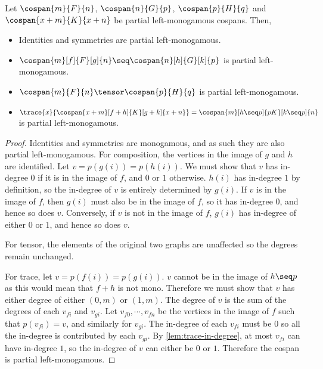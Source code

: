 \begin{lemma}
    \label{lem:partial-monogamous-ops}
    Let \(\cospan{m}{F}{n}\), \(\cospan{n}{G}{p}\), \(\cospan{p}{H}{q}\) and \(\cospan{x+m}{K}{x+n}\) be partial left-monogamous cospans.
    Then,
    \begin{itemize}
        \item Identities and symmetries are partial left-monogamous.
        \item \(\cospan{m}[f]{F}[g]{n} \seq \cospan{n}[h]{G}[k]{p}\) is partial left-monogamous.
        \item \(\cospan{m}{F}{n} \tensor \cospan{p}{H}{q}\) is partial left-monogamous.
        \item \(\trace{x}{\cospan{x+m}[f+h]{K}[g+k]{x+n}} = \cospan{m}[h \seq p]{pK}[k \seq p]{n}\) is partial left-monogamous.
    \end{itemize}
\end{lemma}
\begin{proof}
    Identities and symmetries are monogamous, and as such they are also partial left-monogamous.
    For composition, the vertices in the image of \(g\) and \(h\) are identified.
    Let \(v = p(g(i)) = p(h(i))\).
    We must show that \(v\) has in-degree \(0\) if it is in the image of \(f\), and \(0\) or \(1\) otherwise.
    \(h(i)\) has in-degree \(1\) by definition, so the in-degree of \(v\) is entirely determined by \(g(i)\).
    If \(v\) is in the image of \(f\), then \(g(i)\) must also be in the image of \(f\), so it has in-degree \(0\), and hence so does \(v\).
    Conversely, if \(v\) is not in the image of \(f\), \(g(i)\) has in-degree of either \(0\) or \(1\), and hence so does \(v\).

    For tensor, the elements of the original two graphs are unaffected so the degrees remain unchanged.

    For trace, let \(v = p(f(i)) = p(g(i))\).
    \(v\) cannot be in the image of \(h \seq p\) as this would mean that \(f + h\) is not mono.
    Therefore we must show that \(v\) has either degree of either \((0,m)\) or \((1,m)\).
    The degree of \(v\) is the sum of the degrees of each \(v_{fi}\) and \(v_{gi}\).
    Let \(v_{f0},\cdots,v_{fn}\) be the vertices in the image of \(f\) such that \(p(v_{fi}) = v\), and similarly for \(v_{gi}\).
    The in-degree of each \(v_{fi}\) must be \(0\) so all the in-degree is contributed by each \(v_{gi}\).
    By \cref{lem:trace-in-degree}, at most \(v_{fi}\) can have in-degree \(1\), so the in-degree of \(v\) can either be \(0\) or \(1\).
    Therefore the cospan is partial left-monogamous.
\end{proof}

